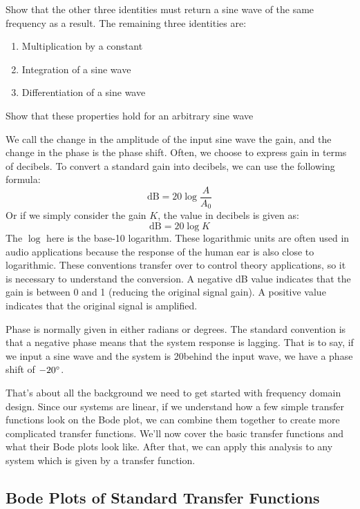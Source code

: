 \begin{exercise}
    Show that the other three identities must return a sine wave of the same frequency as a result. The remaining three identities are:
    \begin{enumerate}
        \item Multiplication by a constant
        \item Integration of a sine wave
        \item Differentiation of a sine wave
    \end{enumerate}

    Show that these properties hold for an arbitrary sine wave
\end{exercise}

We call the change in the amplitude of the input sine wave the gain, and the change in the phase is the phase shift. Often, we choose to express gain in terms of decibels. To convert a standard gain into decibels, we can use the following formula:
$$\textrm{dB}=20\log\frac{A}{A_0}$$
Or if we simply consider the gain $K$, the value in decibels is given as:
$$\textrm{dB}=20\log K$$
The $\log$ here is the base-10 logarithm. These logarithmic units are often used in audio applications because the response of the human ear is also close to logarithmic. These conventions transfer over to control theory applications, so it is necessary to understand the conversion. A negative dB value indicates that the gain is between 0 and 1 (reducing the original signal gain). A positive value indicates that the original signal is amplified.

Phase is normally given in either radians or degrees. The standard convention is that a negative phase means that the system response is lagging. That is to say, if we input a sine wave and the system is 20\degree behind the input wave, we have a phase shift of $-20\degree$.

That's about all the background we need to get started with frequency domain design. Since our systems are linear, if we understand how a few simple transfer functions look on the Bode plot, we can combine them together to create more complicated transfer functions. We'll now cover the basic transfer functions and what their Bode plots look like. After that, we can apply this analysis to any system which is given by a transfer function.

\subsection{Bode Plots of Standard Transfer Functions}

